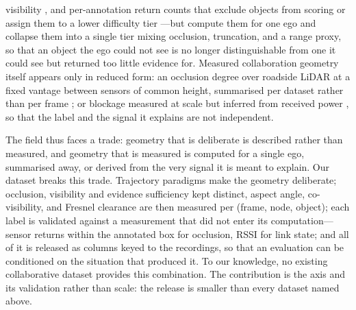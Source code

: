 visibility \cite{nuscenes}, and per-annotation return counts that exclude
objects from scoring or assign them to a lower difficulty tier
\cite{nuscenes,waymo}---but compute them for one ego and collapse them into a
single tier mixing occlusion, truncation, and a range proxy, so that an object
the ego could not see is no longer distinguishable from one it could see but
returned too little evidence for. Measured collaboration geometry itself appears
only in reduced form: an occlusion degree over roadside LiDAR at a fixed vantage
between sensors of common height, summarised per dataset rather than per frame
\cite{inscope}; or blockage measured at scale but inferred from received power
\cite{deepsense6g}, so that the label and the signal it explains are not
independent.

The field thus faces a trade: geometry that is deliberate is described rather
than measured, and geometry that is measured is computed for a single ego,
summarised away, or derived from the very signal it is meant to explain. Our
dataset breaks this trade. Trajectory paradigms make the geometry deliberate;
occlusion, visibility and evidence sufficiency kept distinct, aspect angle,
co-visibility, and Fresnel clearance are then measured per (frame, node,
object); each label is validated against a measurement that did not enter its
computation---sensor returns within the annotated box for occlusion, RSSI for
link state; and all of it is released as columns keyed to the recordings, so
that an evaluation can be conditioned on the situation that produced it. To our
knowledge, no existing collaborative dataset provides this combination. The
contribution is the axis and its validation rather than scale: the release is
smaller than every dataset named above.
